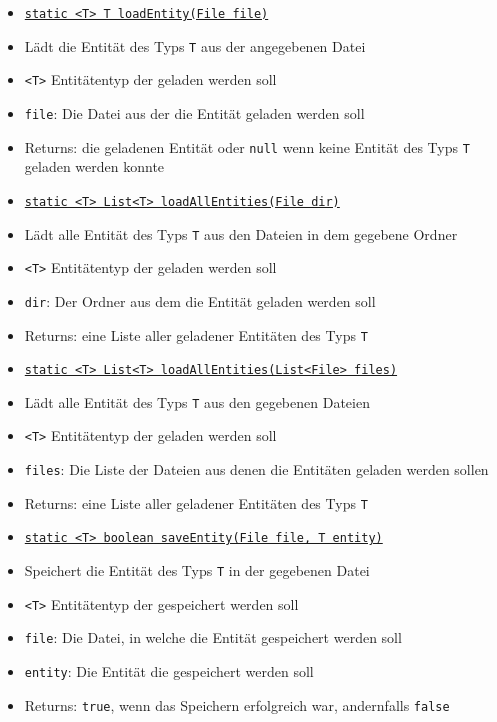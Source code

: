 \documentclass[parskip=full,11pt]{scrartcl}
\begin{document}
\begin{itemize}\itemsep -10pt
	\item \underline{\texttt{static <T> T loadEntity(File file)}}
	\item[] Lädt die Entität des Typs \texttt{T} aus der angegebenen Datei 
	\item[] \texttt{<T>} Entitätentyp der geladen werden soll
	\item[] \texttt{file}: Die Datei aus der die Entität geladen werden soll
	\item[]Returns: die geladenen Entität oder \texttt{null} wenn keine Entität des Typs \texttt{T} geladen werden konnte
	
	\item \underline{\texttt{static <T> List<T> loadAllEntities(File dir)}}
	\item[] Lädt alle Entität des Typs \texttt{T} aus den Dateien in dem gegebene Ordner 
	\item[] \texttt{<T>} Entitätentyp der geladen werden soll
	\item[] \texttt{dir}: Der Ordner aus dem die Entität geladen werden soll
	\item[]Returns: eine Liste aller geladener Entitäten des Typs \texttt{T}
	
	\item \underline{\texttt{static <T> List<T> loadAllEntities(List<File> files)}}
	\item[] Lädt alle Entität des Typs \texttt{T} aus den gegebenen Dateien
	\item[] \texttt{<T>} Entitätentyp der geladen werden soll
	\item[] \texttt{files}: Die Liste der Dateien aus denen die Entitäten geladen werden sollen
	\item[]Returns: eine Liste aller geladener Entitäten des Typs \texttt{T}

	\item \underline{\texttt{static <T> boolean saveEntity(File file, T entity)}}
\item[] Speichert die Entität des Typs \texttt{T} in der gegebenen Datei
\item[] \texttt{<T>} Entitätentyp der gespeichert werden soll
\item[] \texttt{file}: Die Datei, in welche die Entität gespeichert werden soll
\item[] \texttt{entity}: Die Entität die gespeichert werden soll
\item[]Returns: \texttt{true}, wenn das Speichern erfolgreich war, andernfalls \texttt{false}
\end{itemize}
\end{document}
